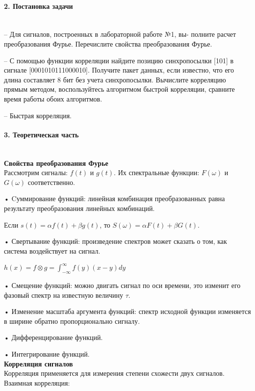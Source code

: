 \documentclass[12pt,a4paper]{report}
\begin{document}
\paragraph{2. Постановка задачи\\\\}
– Для сигналов, построенных в лабораторной работе №1, вы-
полните расчет преобразования Фурье. Перечислите свойства
преобразования Фурье.

– С помощью функции корреляции найдите позицию синхропосылки [101] в сигнале [0001010111000010]. Получите пакет
данных, если известно, что его длина составляет 8 бит без
учета синхропосылки. Вычислите корреляцию прямым методом, воспользуйтесь алгоритмом быстрой корреляции, сравните время работы обоих алгоритмов.

– Быстрая корреляция.

\paragraph{3. Теоретическая часть \\\\}
\textbf{Свойства преобразования Фурье\\}
Рассмотрим сигналы: $f (t)$ и $ g (t)$. Их спектральные функции: $F(\omega)$ и $G(\omega)$ соответственно.

• Cуммирование функций: линейная комбинация преобразованных равна результату преобразования линейных комбинаций.
  \begin{center}
Если $s(t) = \alpha f(t) + \beta g(t)$, то $S(\omega) = \alpha F (t) + \beta G(t)$.
  \end{center}
  
  • Свертывание функций: произведение спектров может сказать о том, как система воздействует на сигнал.
  \begin{center}
$h(x)=f \otimes g =\int_{-\infty}^{\infty} f(y)(x-y)dy$
  \end{center}
  
• Смещение функций: можно двигать сигнал по оси времени, это изменит его фазовый спектр на известную величину $\tau$.

• Изменение масштаба аргумента функций: спектр исходной функции изменяется в ширине обратно пропорционально сигналу.

• Дифференцирование функций.

• Интегрирование функций. 
\\

\textbf{Корреляция сигналов\\}
Корреляция применяется для измерения степени схожести двух сигналов. Взаимная корреляция:
\end{document}
